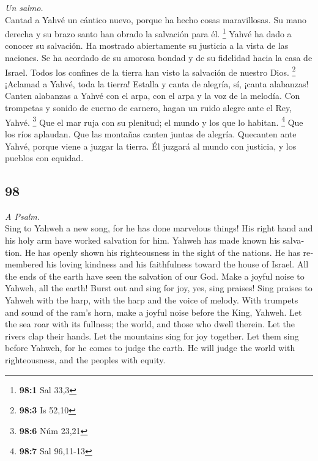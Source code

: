 \begin{paracol}{2}
\emph{Un salmo.}\\
 Cantad a Yahvé un cántico nuevo, porque ha hecho cosas
maravillosas. Su mano derecha y su brazo santo han obrado la salvación
para él. \footnote{\textbf{98:1} Sal 33,3}  Yahvé ha dado
a conocer su salvación. Ha mostrado abiertamente su justicia a la vista
de las naciones.  Se ha acordado de su amorosa bondad y de
su fidelidad hacia la casa de Israel. Todos los confines de la tierra
han visto la salvación de nuestro Dios. \footnote{\textbf{98:3} Is 52,10}
 ¡Aclamad a Yahvé, toda la tierra! Estalla y canta de
alegría, sí, ¡canta alabanzas!  Canten alabanzas a Yahvé
con el arpa, con el arpa y la voz de la melodía.  Con
trompetas y sonido de cuerno de carnero, hagan un ruido alegre ante el
Rey, Yahvé. \footnote{\textbf{98:6} Núm 23,21}  Que el mar
ruja con su plenitud; el mundo y los que lo habitan. \footnote{\textbf{98:7}
  Sal 96,11-13}  Que los ríos aplaudan. Que las montañas
canten juntas de alegría.  Quecanten ante Yahvé, porque
viene a juzgar la tierra. Él juzgará al mundo con justicia, y los
pueblos con equidad.

\switchcolumn
\begin{otherlanguage}{english}

\hypertarget{section-195}{%
\section{98}\label{section-195}}

\emph{A Psalm.}\\
 Sing to Yahweh a new song, for he has done marvelous
things! His right hand and his holy arm have worked salvation for him.
 Yahweh has made known his salvation. He has openly shown
his righteousness in the sight of the nations.  He has
remembered his loving kindness and his faithfulness toward the house of
Israel. All the ends of the earth have seen the salvation of our God.
 Make a joyful noise to Yahweh, all the earth! Burst out
and sing for joy, yes, sing praises!  Sing praises to
Yahweh with the harp, with the harp and the voice of melody.
 With trumpets and sound of the ram's horn, make a joyful
noise before the King, Yahweh.  Let the sea roar with its
fullness; the world, and those who dwell therein.  Let the
rivers clap their hands. Let the mountains sing for joy together.
 Let them sing before Yahweh, for he comes to judge the
earth. He will judge the world with righteousness, and the peoples with
equity.


\end{otherlanguage}
\end{paracol}
